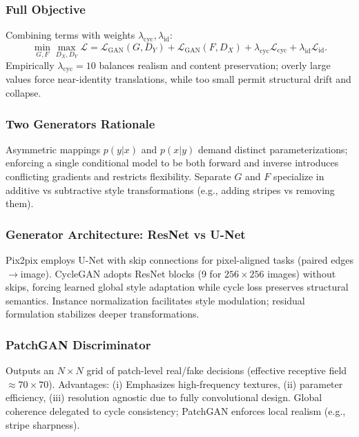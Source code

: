 \documentclass[conference]{IEEEtran}
\begin{document}
\subsubsection{Full Objective} Combining terms with weights $\lambda_{\text{cyc}}, \lambda_{\text{id}}$:
\begin{equation}
 \min_{G,F} \max_{D_X,D_Y} \mathcal{L} = \mathcal{L}_{\text{GAN}}(G,D_Y) + \mathcal{L}_{\text{GAN}}(F,D_X) + \lambda_{\text{cyc}} \mathcal{L}_{\text{cyc}} + \lambda_{\text{id}} \mathcal{L}_{\text{id}}.
\end{equation}
Empirically $\lambda_{\text{cyc}}=10$ balances realism and content preservation; overly large values force near-identity translations, while too small permit structural drift and collapse.

\subsubsection{Two Generators Rationale} Asymmetric mappings $p(y|x)$ and $p(x|y)$ demand distinct parameterizations; enforcing a single conditional model to be both forward and inverse introduces conflicting gradients and restricts flexibility. Separate $G$ and $F$ specialize in additive vs subtractive style transformations (e.g., adding stripes vs removing them).

\subsubsection{Generator Architecture: ResNet vs U-Net} Pix2pix employs U-Net with skip connections for pixel-aligned tasks (paired edges$\to$image). CycleGAN adopts ResNet blocks (9 for $256\times256$ images) without skips, forcing learned global style adaptation while cycle loss preserves structural semantics. Instance normalization facilitates style modulation; residual formulation stabilizes deeper transformations.

\subsubsection{PatchGAN Discriminator} Outputs an $N\times N$ grid of patch-level real/fake decisions (effective receptive field $\approx 70\times70$). Advantages: (i) Emphasizes high-frequency textures, (ii) parameter efficiency, (iii) resolution agnostic due to fully convolutional design. Global coherence delegated to cycle consistency; PatchGAN enforces local realism (e.g., stripe sharpness).
\end{document}

